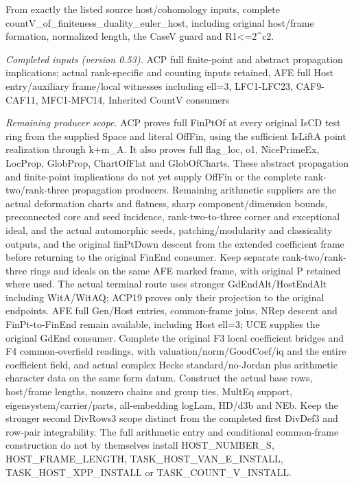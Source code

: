 From exactly the listed source host/cohomology inputs, complete countV\_\allowbreak of\_\allowbreak finiteness\_\allowbreak duality\_\allowbreak euler\_\allowbreak host, including original host/frame formation, normalized length, the CaseV guard and R1<=2\textasciicircum{}c2.

\emph{Completed inputs (version 0.53).} ACP full finite-point and abstract propagation implications; actual rank-specific and counting inputs retained, AFE full Host entry/auxiliary frame/local witnesses including ell=3, LFC1-LFC23, CAF9-CAF11, MFC1-MFC14, Inherited CountV consumers

\emph{Remaining producer scope.} ACP proves full FinPtOf at every original IsCD test ring from the supplied Space and literal OffFin, using the sufficient IsLiftA point realization through k+m\_\allowbreak A. It also proves full flag\_\allowbreak loc, o1, NicePrimeEx, LocProp, GlobProp, ChartOfFlat and GlobOfCharts. These abstract propagation and finite-point implications do not yet supply OffFin or the complete rank-two/rank-three propagation producers. Remaining arithmetic suppliers are the actual deformation charts and flatness, sharp component/dimension bounds, preconnected core and seed incidence, rank-two-to-three corner and exceptional ideal, and the actual automorphic seeds, patching/modularity and classicality outputs, and the original finPtDown descent from the extended coefficient frame before returning to the original FinEnd consumer. Keep separate rank-two/rank-three rings and ideals on the same AFE marked frame, with original P retained where used. The actual terminal route uses stronger GdEndAlt/HostEndAlt including WitA/WitAQ; ACP19 proves only their projection to the original endpoints. AFE full Gen/Host entries, common-frame joins, NRep descent and FinPt-to-FinEnd remain available, including Host ell=3; UCE supplies the original GdEnd consumer. Complete the original F3 local coefficient bridges and F4 common-overfield readings, with valuation/norm/GoodCoef/iq and the entire coefficient field, and actual complex Hecke standard/no-Jordan plus arithmetic character data on the same form datum. Construct the actual base rows, host/frame lengths, nonzero chains and group ties, MultEq support, eigensystem/carrier/parts, all-embedding logLam, HD/d3b and NEb. Keep the stronger second DivRows3 scope distinct from the completed first DivDef3 and row-pair integrability. The full arithmetic entry and conditional common-frame construction do not by themselves install HOST\_\allowbreak NUMBER\_\allowbreak S, HOST\_\allowbreak FRAME\_\allowbreak LENGTH, TASK\_\allowbreak HOST\_\allowbreak VAN\_\allowbreak E\_\allowbreak INSTALL, TASK\_\allowbreak HOST\_\allowbreak XPP\_\allowbreak INSTALL or TASK\_\allowbreak COUNT\_\allowbreak V\_\allowbreak INSTALL.


